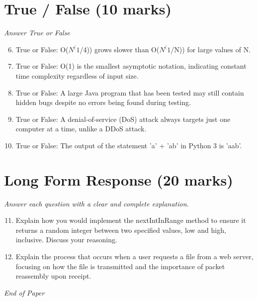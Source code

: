 \documentclass[12pt]{article}
\begin{document}
\section*{True / False (10 marks)}
\textit{Answer True or False}
\begin{enumerate}[label=\arabic*.]
\setcounter{enumi}{5}
\item True or False: O($N^(1$/4)) grows slower than O($N^(1$/N)) for large values of N.
\item True or False: O(1) is the smallest asymptotic notation, indicating constant time complexity regardless of input size.
\item True or False: A large Java program that has been tested may still contain hidden bugs despite no errors being found during testing.
\item True or False: A denial-of-service (DoS) attack always targets just one computer at a time, unlike a DDoS attack.
\item True or False: The output of the statement 'a' + 'ab' in Python 3 is 'aab'.
\end{enumerate}

\section*{Long Form Response (20 marks)}
\textit{Answer each question with a clear and complete explanation.}
\begin{enumerate}[label=\arabic*.]
\setcounter{enumi}{10}
\item Explain how you would implement the nextIntInRange method to ensure it returns a random integer between two specified values, low and high, inclusive. Discuss your reasoning.
\item Explain the process that occurs when a user requests a file from a web server, focusing on how the file is transmitted and the importance of packet reassembly upon receipt.
\end{enumerate}

\vfill
\noindent\textit{End of Paper}
\end{document}
